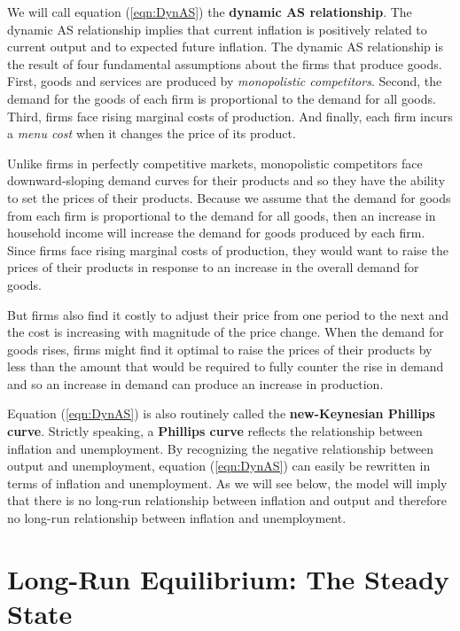 \documentclass[12pt,fleqn]{article}
\begin{document}
We will call equation (\ref{eqn:DynAS}) the \textbf{dynamic AS relationship}. The dynamic AS relationship implies that current inflation is positively related to current output and to expected future inflation. The dynamic AS relationship is the result of four fundamental assumptions about the firms that produce goods.  First, goods and services are produced by \emph{monopolistic competitors}. Second, the demand for the goods of each firm is proportional to the demand for all goods. Third, firms face rising marginal costs of production. And finally, each firm incurs a \emph{menu cost} when it changes the price of its product.


Unlike firms in perfectly competitive markets, monopolistic competitors face downward-sloping demand curves for their products and so they have the ability to set the prices of their products. Because we assume that the demand for goods from each firm is proportional to the demand for all goods, then an increase in household income will increase the demand for goods produced by each firm. Since firms face rising marginal costs of production, they would want to raise the prices of their products in response to an increase in the overall demand for goods.

But firms also find it costly to adjust their price from one period to the next and the cost is increasing with magnitude of the price change. When the demand for goods rises, firms might find it optimal to raise the prices of their products by less than the amount that would be required to fully counter the rise in demand and so an increase in demand can produce an increase in production.

Equation (\ref{eqn:DynAS}) is also routinely called the \textbf{new-Keynesian Phillips curve}. Strictly speaking, a \textbf{Phillips curve} reflects the relationship between inflation and unemployment. By recognizing the negative relationship between output and unemployment, equation (\ref{eqn:DynAS}) can easily be rewritten in terms of inflation and unemployment. As we will see below, the model will imply that there is no long-run relationship between inflation and output and therefore no long-run relationship between inflation and unemployment.




\section{Long-Run Equilibrium: The Steady State}
\end{document}
